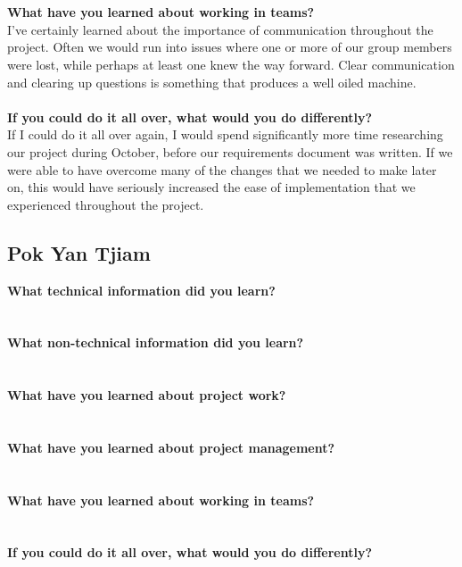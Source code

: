\documentclass[12pt]{article}
\begin{document}
\\\\
\textbf{What have you learned about working in teams?}\\
I've certainly learned about the importance of communication throughout the project. Often we would run into issues where one or more of our group members were lost, while perhaps at least one knew the way forward. Clear communication and clearing up questions is something that produces a well oiled machine.
\\\\
\textbf{If you could do it all over, what would you do differently?}\\
If I could do it all over again, I would spend significantly more time researching our project during October, before our requirements document was written. If we were able to have overcome many of the changes that we needed to make later on, this would have seriously increased the ease of implementation that we experienced throughout the project.
\\
\pagebreak
\subsection{Pok Yan Tjiam}
\textbf{What technical information did you learn?}\\
\\\\
\textbf{What non-technical information did you learn?}\\
\\\\
\textbf{What have you learned about project work?}\\
\\\\
\textbf{What have you learned about project management?}\\
\\\\
\textbf{What have you learned about working in teams?}\\
\\\\
\textbf{If you could do it all over, what would you do differently?}\\
\\
\pagebreak
\end{document}
